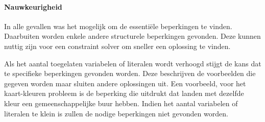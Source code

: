 \paragraph{Nauwkeurigheid}
In alle gevallen was het mogelijk om de essenti\"ele beperkingen te vinden.
Daarbuiten worden enkele andere structurele beperkingen gevonden.
Deze kunnen nuttig zijn voor een constraint solver om sneller een oplossing te vinden.

Als het aantal toegelaten variabelen of literalen wordt verhoogd stijgt de kans dat te specifieke beperkingen gevonden worden.
Deze beschrijven de voorbeelden die gegeven worden maar sluiten andere oplossingen uit.
Een voorbeeld, voor het kaart-kleuren probleem is de beperking die uitdrukt dat landen met dezelfde kleur een gemeenschappelijke buur hebben.
Indien het aantal variabelen of literalen te klein is zullen de nodige beperkingen niet gevonden worden.

